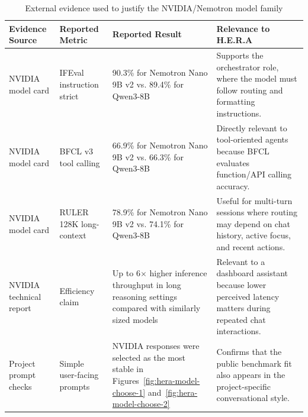 \begin{table}[H]
    \centering
    \caption{External evidence used to justify the NVIDIA/Nemotron model family}
    \label{tab:hera-model-selection-evidence}
    \small
    \renewcommand{\arraystretch}{1.15}
    \begin{tabularx}{\textwidth}{@{}p{3.0cm}p{3.2cm}p{3.0cm}X@{}}
        \toprule
        \textbf{Evidence Source} & \textbf{Reported Metric} & \textbf{Reported Result} & \textbf{Relevance to H.E.R.A} \\
        \midrule
        NVIDIA model card & IFEval instruction strict & 90.3\% for Nemotron Nano 9B v2 vs. 89.4\% for Qwen3-8B & Supports the orchestrator role, where the model must follow routing and formatting instructions. \\
        NVIDIA model card & BFCL v3 tool calling & 66.9\% for Nemotron Nano 9B v2 vs. 66.3\% for Qwen3-8B & Directly relevant to tool-oriented agents because BFCL evaluates function/API calling accuracy. \\
        NVIDIA model card & RULER 128K long-context & 78.9\% for Nemotron Nano 9B v2 vs. 74.1\% for Qwen3-8B & Useful for multi-turn sessions where routing may depend on chat history, active focus, and recent actions. \\
        NVIDIA technical report & Efficiency claim & Up to 6$\times$ higher inference throughput in long reasoning settings compared with similarly sized models & Relevant to a dashboard assistant because lower perceived latency matters during repeated chat interactions. \\
        Project prompt checks & Simple user-facing prompts & NVIDIA responses were selected as the most stable in Figures~\ref{fig:hera-model-choose-1} and~\ref{fig:hera-model-choose-2} & Confirms that the public benchmark fit also appears in the project-specific conversational style. \\
        \bottomrule
    \end{tabularx}
\end{table}

